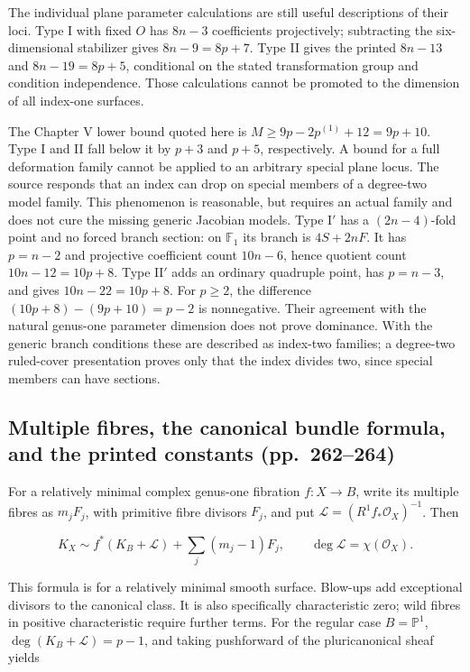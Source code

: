 The individual plane parameter calculations are still useful descriptions of their loci. Type I with fixed \(O\) has \(8n-3\) coefficients projectively; subtracting the six-dimensional stabilizer gives \(8n-9=8p+7\). Type II gives the printed \(8n-13\) and \(8n-19=8p+5\), conditional on the stated transformation group and condition independence. Those calculations cannot be promoted to the dimension of all index-one surfaces.

The Chapter V lower bound quoted here is \(M\ge9p-2p^{(1)}+12=9p+10\). Type I and II fall below it by \(p+3\) and \(p+5\), respectively. A bound for a full deformation family cannot be applied to an arbitrary special plane locus. The source responds that an index can drop on special members of a degree-two model family. This phenomenon is reasonable, but requires an actual family and does not cure the missing generic Jacobian models. Type \(\mathrm I'\) has a \((2n-4)\)-fold point and no forced branch section: on \(\mathbb F_1\) its branch is \(4S+2nF\). It has \(p=n-2\) and projective coefficient count \(10n-6\), hence quotient count \(10n-12=10p+8\). Type \(\mathrm{II}'\) adds an ordinary quadruple point, has \(p=n-3\), and gives \(10n-22=10p+8\). For \(p\ge2\), the difference \((10p+8)-(9p+10)=p-2\) is nonnegative. Their agreement with the natural genus-one parameter dimension does not prove dominance. With the generic branch conditions these are described as index-two families; a degree-two ruled-cover presentation proves only that the index divides two, since special members can have sections.

\subsection{Multiple fibres, the canonical bundle formula, and the printed constants (pp.~262--264)}\label{cp2-vii-4-3}

For a relatively minimal complex genus-one fibration \(f:X\to B\), write its multiple fibres as \(m_jF_j\), with primitive fibre divisors \(F_j\), and put \(\mathcal L=(R^1f_*\mathcal O_X)^{-1}\). Then

\[
K_X\sim f^*(K_B+\mathcal L)+\sum_j(m_j-1)F_j,
\qquad \deg\mathcal L=\chi(\mathcal O_X).
\]

This formula is for a relatively minimal smooth surface. Blow-ups add exceptional divisors to the canonical class. It is also specifically characteristic zero; wild fibres in positive characteristic require further terms. For the regular case \(B=\mathbb P^1\), \(\deg(K_B+\mathcal L)=p-1\), and taking pushforward of the pluricanonical sheaf yields

